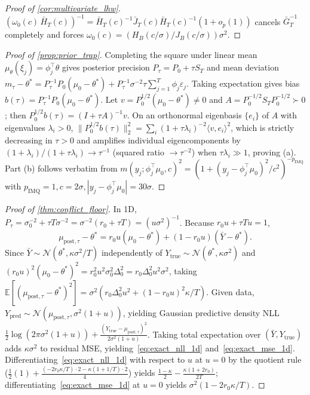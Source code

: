 \documentclass[11pt,a4paper,reqno]{amsart}
\theoremstyle{definition}
\theoremstyle{remark}
\newcommand{\E}{\mathbb{E}}
\newcommand{\Ncal}{\mathcal{N}}
\begin{document}
\begin{proof}[Proof of \cref{cor:multivariate_lhw}]
$(\omega_0(c)\,\bar{H}_T(c))^{-1} = \bar{H}_T(c)^{-1}\bar{J}_T(c)\bar{H}_T(c)^{-1}(1+o_p(1))$ cancels $\bar{G}_T^{-1}$ completely and forces $\omega_0(c) = (H_B(c/\sigma)/J_B(c/\sigma))\sigma^2$.
\end{proof}

\begin{proof}[Proof of \cref{prop:prior_trap}]
Completing the square under linear mean $\mu_\theta(\xi_j) = \phi_j^\top \theta$ gives posterior precision $P_\tau = P_0 + \tau S_T$ and mean deviation $m_\tau - \theta^* = P_\tau^{-1} P_0(\mu_0 - \theta^*) + P_\tau^{-1} \sigma^{-2}\tau \sum_{j=1}^T \phi_j \varepsilon_j$. Taking expectation gives bias $b(\tau) = P_\tau^{-1} P_0(\mu_0 - \theta^*)$. Let $v = P_0^{1/2}(\mu_0 - \theta^*) \neq 0$ and $A = P_0^{-1/2} S_T P_0^{-1/2} \succ 0$; then $P_0^{1/2}b(\tau) = (I + \tau A)^{-1}v$. On an orthonormal eigenbasis $\{e_i\}$ of $A$ with eigenvalues $\lambda_i > 0$, $\|P_0^{1/2}b(\tau)\|_2^2 = \sum_i (1 + \tau\lambda_i)^{-2} \langle v, e_i\rangle^2$, which is strictly decreasing in $\tau > 0$ and amplifies individual eigencomponents by $(1+\lambda_i)/(1+\tau\lambda_i) \to \tau^{-1}$ (squared ratio $\to \tau^{-2}$) when $\tau\lambda_i \gg 1$, proving (a). Part (b) follows verbatim from $m(y_j; \phi_j^\top\mu_0, c)^2 = (1 + (y_j - \phi_j^\top\mu_0)^2/c^2)^{-p_{\mathrm{IMQ}}}$ with $p_{\mathrm{IMQ}}=1, c=2\sigma, |y_j-\phi_j^\top\mu_0|=30\sigma$.
\end{proof}

\begin{proof}[Proof of \cref{thm:conflict_floor}]
In 1D, $P_{\tau} = \sigma_0^{-2} + \tau T \sigma^{-2} = \sigma^{-2}(r_0 + \tau T) = (u\sigma^2)^{-1}$. Because $r_0 u + \tau T u = 1$,
\[
\mu_{\mathrm{post},\tau} - \theta^* = r_0 u(\mu_0 - \theta^*) + (1 - r_0 u)(\bar{Y} - \theta^*).
\]
Since $\bar{Y} \sim \Ncal(\theta^*, \kappa\sigma^2 / T)$ independently of $Y_{\mathrm{true}} \sim \Ncal(\theta^*, \kappa\sigma^2)$ and $(r_0 u)^2(\mu_0-\theta^*)^2 = r_0^2 u^2 \sigma_0^2 \Delta_0^2 = r_0 \Delta_0^2 u^2 \sigma^2$, taking $\E[(\mu_{\mathrm{post},\tau} - \theta^*)^2] = \sigma^2(r_0 \Delta_0^2 u^2 + (1-r_0 u)^2 \kappa / T)$. Given data, $Y_{\mathrm{pred}} \sim \Ncal(\mu_{\mathrm{post},\tau}, \sigma^2(1+u))$, yielding Gaussian predictive density NLL $\frac{1}{2}\log(2\pi\sigma^2(1+u)) + \frac{(Y_{\mathrm{true}} - \mu_{\mathrm{post},\tau})^2}{2\sigma^2(1+u)}$. Taking total expectation over $(\bar{Y}, Y_{\mathrm{true}})$ adds $\kappa\sigma^2$ to residual MSE, yielding~\eqref{eq:exact_nll_1d} and~\eqref{eq:exact_mse_1d}. Differentiating~\eqref{eq:exact_nll_1d} with respect to $u$ at $u=0$ by the quotient rule ($\frac{1}{2}(1) + \frac{(-2r_0\kappa/T)\cdot 2 - \kappa(1+1/T)\cdot 2}{4}$) yields $\frac{1-\kappa}{2} - \frac{\kappa(1+2r_0)}{2T}$; differentiating~\eqref{eq:exact_mse_1d} at $u=0$ yields $\sigma^2(1 - 2r_0\kappa/T)$.
\end{proof}
\end{document}
